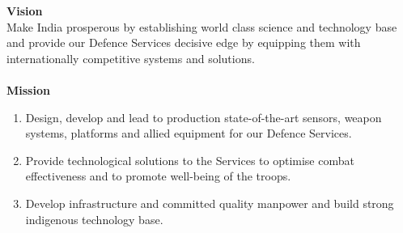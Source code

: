 \documentclass[12pt]{report}
\begin{document}
\textbf{Vision}\\
Make India prosperous by establishing world class science and technology base and provide our Defence Services decisive edge by equipping them with internationally competitive systems and solutions. \\ \\
\textbf{Mission}
\begin{enumerate}
\item Design, develop and lead to production state-of-the-art sensors, weapon systems, platforms and allied equipment for our Defence Services.
\item Provide technological solutions to the Services to optimise combat effectiveness and to promote well-being of the troops.
\item Develop infrastructure and committed quality manpower and build strong indigenous technology base.
\end{enumerate}
\end{document}
